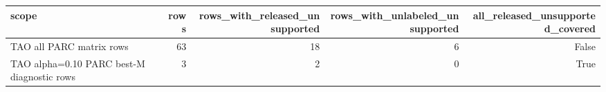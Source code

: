 \begin{tabular}{lrrrr}
\toprule
scope & rows & rows_with_released_unsupported & rows_with_unlabeled_unsupported & all_released_unsupported_covered \\
\midrule
TAO all PARC matrix rows & 63 & 18 & 6 & False \\
TAO alpha=0.10 PARC best-M diagnostic rows & 3 & 2 & 0 & True \\
\bottomrule
\end{tabular}

